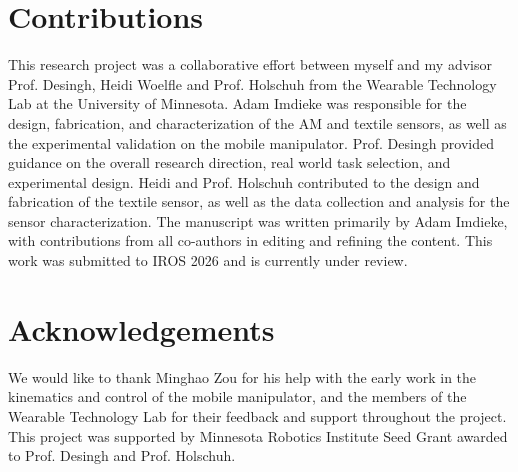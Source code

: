 \section{Contributions} 
This research project was a collaborative effort between myself and my advisor Prof. Desingh, Heidi Woelfle and Prof. Holschuh from the Wearable Technology Lab at the University of Minnesota. Adam Imdieke was responsible for the design, fabrication, and characterization of the AM and textile sensors, as well as the experimental validation on the mobile manipulator. Prof. Desingh provided guidance on the overall research direction, real world task selection, and experimental design. Heidi and Prof. Holschuh contributed to the design and fabrication of the textile sensor, as well as the data collection and analysis for the sensor characterization. The manuscript was written primarily by Adam Imdieke, with contributions from all co-authors in editing and refining the content. This work was submitted to IROS 2026 and is currently under review. 

\section{Acknowledgements}
We would like to thank Minghao Zou for his help with the early work in the kinematics and control of the mobile manipulator, and the members of the Wearable Technology Lab for their feedback and support throughout the project. This project was supported by Minnesota Robotics Institute Seed Grant awarded to Prof. Desingh and Prof. Holschuh.